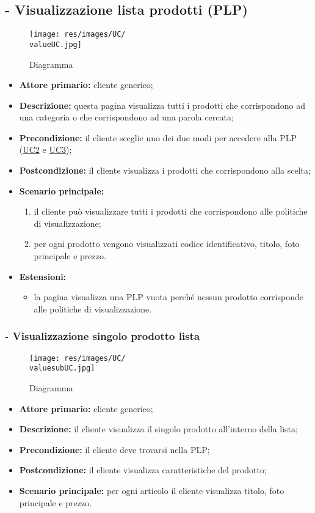 \subsection{ - Visualizzazione lista prodotti (PLP)}
\begin{figure}[H]
    \centering
    \texttt{[image: res/images/UC/\\valueUC.jpg]}
    \caption{Diagramma }
\end{figure}
\begin{itemize}
    \item \textbf{Attore primario:} cliente generico;
    \item \textbf{Descrizione:} questa pagina visualizza tutti i prodotti che corrispondono ad una categoria o che corrispondono ad una parola cercata;
    \item \textbf{Precondizione:} il cliente sceglie uno dei due modi per accedere alla PLP (\hyperref[UC2]{UC2} e \hyperref[UC3]{UC3});
    \item \textbf{Postcondizione:} il cliente visualizza i prodotti che corrispondono alla scelta;
    \item \textbf{Scenario principale:}
          \begin{enumerate}
              \item il cliente può visualizzare tutti i prodotti che corrispondono alle politiche di visualizzazione;
              \item per ogni prodotto vengono visualizzati codice identificativo, titolo, foto principale e prezzo.
          \end{enumerate}
    \item \textbf{Estensioni:}
          \begin{itemize}
              \item la pagina visualizza una PLP vuota perché nessun prodotto corrisponde alle politiche di visualizzazione.
          \end{itemize}
\end{itemize}

\stepsubUserCase
\subsubsection{ - Visualizzazione singolo prodotto lista}
\begin{figure}[H]
    \centering
    \texttt{[image: res/images/UC/\\valuesubUC.jpg]}
    \caption{Diagramma }
\end{figure}
\begin{itemize}
    \item \textbf{Attore primario:} cliente generico;
    \item \textbf{Descrizione:} il cliente visualizza il singolo prodotto all'interno della lista;
    \item \textbf{Precondizione:} il cliente deve trovarsi nella PLP;
    \item \textbf{Postcondizione:} il cliente visualizza caratteristiche del prodotto;
    \item \textbf{Scenario principale:} per ogni articolo il cliente visualizza titolo, foto principale e prezzo.
\end{itemize}


